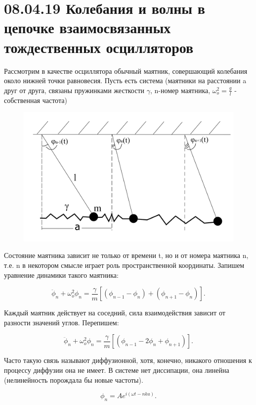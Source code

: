 
\usepackage{graphicx}
\usepackage{wrapfig}
\usepackage{ dsfont }



\section{08.04.19 Колебания и волны в цепочке взаимосвязанных тождественных осцилляторов}

Рассмотрим в качестве осциллятора обычный маятник, совершающий колебания около нижней точки равновесия. Пусть есть система (маятники на расстоянии a друг от друга, связаны пружинками жесткости $\gamma$, n-номер маятника, $\omega_o^2=\frac{g}{l}$ - собственная частота)

\begin{figure}[h!]
	\centering
	\includegraphics[width=0.5\linewidth]{fig/fig1.jpg}
	\label{fig:fig1}
\end{figure}

Состояние маятника зависит не только от времени t, но и от номера маятника n, т.е. n в некотором смысле играет роль пространственной координаты. Запишем уравнение динамики такого маятника:

\begin{equation}
	\ddot{\phi}_n+\omega^2_o \phi_n=\frac{\gamma}{m}[(\phi_{n-1}-\phi_n)+(\phi_{n+1}-\phi_n)].
	\label{eq:1}
\end{equation}

Каждый маятник действует на соседний, сила взаимодействия зависит от разности значений углов. Перепишем:

\begin{equation*}
	\ddot{\phi}_n+\omega^2_o \phi_n=\frac{\gamma}{m}[(\phi_{n-1}-2\phi_n+\phi_{n+1})].
\end{equation*}

Часто такую связь называют диффузионной, хотя, конечно, никакого отношения к процессу диффузии она не имеет. В системе нет диссипации, она линейна (нелинейность порождала бы новые частоты).

\begin{equation}
	\phi_n=A e^{i(\omega t-nka)}.
	\label{eq:2}
\end{equation}

